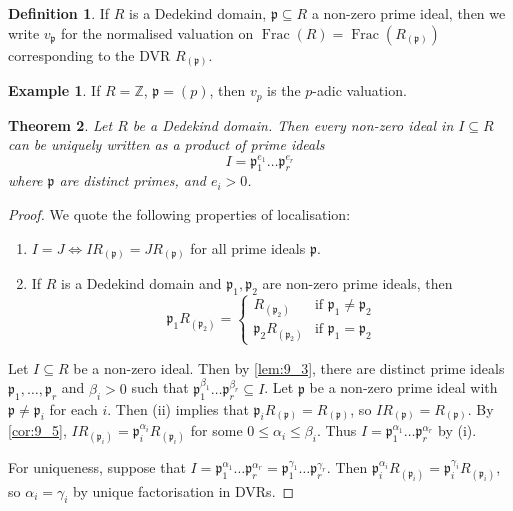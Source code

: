 \documentclass[11pt]{article}
\theoremstyle{definition}
\newtheorem{definition}{Definition}[subsection]
\newtheorem*{example}{Example}
\theoremstyle{plain}
\newtheorem{theorem}[definition]{Theorem}
\theoremstyle{remark}
\DeclareMathOperator{\Frac}{Frac}
\newcommand{\ZZ}{\mathbb{Z}}
\newcommand{\fp}{\mathfrak{p}}
\begin{document}
\begin{definition}\label{def:9_6}
    If $R$ is a Dedekind domain, $\fp \subseteq R$ a non-zero prime ideal, then we write $v_{\fp}$ for the normalised valuation on $\Frac(R) = \Frac(R_{(\fp)})$ corresponding to the DVR $R_{(\fp)}$.
\end{definition}

\begin{example}
    If $R = \ZZ$, $\fp = (p)$, then $v_p$ is the $p$-adic valuation.
\end{example}

\begin{theorem}\label{thm:9_7}
    Let $R$ be a Dedekind domain. Then every non-zero ideal in $I \subseteq R$ can be uniquely written as a product of prime ideals
    \begin{equation*}
        I = \fp_1^{e_1} \ldots \fp_r^{e_r}
    \end{equation*}
    where $\fp$ are distinct primes, and $e_i > 0$.
\end{theorem}
\begin{proof}
    We quote the following properties of localisation:
    \begin{enumerate}
        \item $I = J \iff I R_{(\fp)} = J R_{(\fp)}$ for all prime ideals $\fp$.
        \item If $R$ is a Dedekind domain and $\fp_1, \fp_2$ are non-zero prime ideals, then
            \begin{equation*}
                \fp_1 R_{(\fp_2)} =
                \begin{cases}
                    R_{(\fp_2)} &\text{if } \fp_1 \neq \fp_2\\
                    \fp_2 R_{(\fp_2)} &\text{if } \fp_1 = \fp_2
                \end{cases}
            \end{equation*}
    \end{enumerate}

    Let $I \subseteq R$ be a non-zero ideal. Then by \autoref{lem:9_3}, there are distinct prime ideals $\fp_1, \ldots, \fp_r$ and $\beta_i > 0$ such that $\fp_1^{\beta_1} \ldots \fp_r^{\beta_r} \subseteq I$. Let $\fp$ be a non-zero prime ideal with $\fp \neq \fp_i$ for each $i$. Then (ii) implies that $\fp_i R_{(\fp)} = R_{(\fp)}$, so $I R_{(\fp)} = R_{(\fp)}$. By \autoref{cor:9_5}, $I R_{(\fp_i)} = \fp_i^{\alpha_i} R_{(\fp_i)}$ for some $0 \le \alpha_i \le \beta_i$. Thus $I = \fp_1^{\alpha_1} \ldots \fp_r^{\alpha_r}$ by (i).

    For uniqueness, suppose that $I = \fp_1^{\alpha_1} \ldots \fp_r^{\alpha_r} = \fp_1^{\gamma_1} \ldots \fp_r^{\gamma_r}$. Then $\fp_i^{\alpha_i} R_{(\fp_i)} = \fp_i^{\gamma_i} R_{(\fp_i)}$, so $\alpha_i = \gamma_i$ by unique factorisation in DVRs.
\end{proof}
\end{document}
